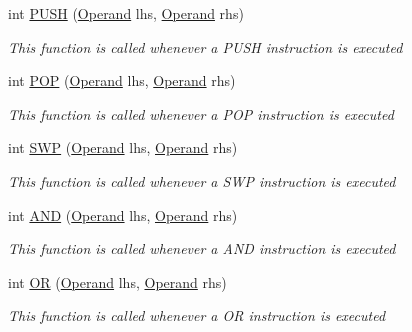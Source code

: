\begin{DoxyCompactItemize}
int \hyperlink{class_c_p_u___o_s___simulator_1_1_c_p_u_1_1_instruction_a4a6711b8309af629c9460cdadc340444}{P\+U\+S\+H} (\hyperlink{class_c_p_u___o_s___simulator_1_1_c_p_u_1_1_operand}{Operand} lhs, \hyperlink{class_c_p_u___o_s___simulator_1_1_c_p_u_1_1_operand}{Operand} rhs)
\begin{DoxyCompactList}\small\item\em This function is called whenever a P\+U\+S\+H instruction is executed \end{DoxyCompactList}\item 
int \hyperlink{class_c_p_u___o_s___simulator_1_1_c_p_u_1_1_instruction_a16a47493684bb30a289d337188fb77b6}{P\+O\+P} (\hyperlink{class_c_p_u___o_s___simulator_1_1_c_p_u_1_1_operand}{Operand} lhs, \hyperlink{class_c_p_u___o_s___simulator_1_1_c_p_u_1_1_operand}{Operand} rhs)
\begin{DoxyCompactList}\small\item\em This function is called whenever a P\+O\+P instruction is executed \end{DoxyCompactList}\item 
int \hyperlink{class_c_p_u___o_s___simulator_1_1_c_p_u_1_1_instruction_ac86363232497de67ac268dd8942294a3}{S\+W\+P} (\hyperlink{class_c_p_u___o_s___simulator_1_1_c_p_u_1_1_operand}{Operand} lhs, \hyperlink{class_c_p_u___o_s___simulator_1_1_c_p_u_1_1_operand}{Operand} rhs)
\begin{DoxyCompactList}\small\item\em This function is called whenever a S\+W\+P instruction is executed \end{DoxyCompactList}\item 
int \hyperlink{class_c_p_u___o_s___simulator_1_1_c_p_u_1_1_instruction_a4b5e469acee3a32016220af620b98650}{A\+N\+D} (\hyperlink{class_c_p_u___o_s___simulator_1_1_c_p_u_1_1_operand}{Operand} lhs, \hyperlink{class_c_p_u___o_s___simulator_1_1_c_p_u_1_1_operand}{Operand} rhs)
\begin{DoxyCompactList}\small\item\em This function is called whenever a A\+N\+D instruction is executed \end{DoxyCompactList}\item 
int \hyperlink{class_c_p_u___o_s___simulator_1_1_c_p_u_1_1_instruction_a32adcd85bab5adfeeb4effa90275dee5}{O\+R} (\hyperlink{class_c_p_u___o_s___simulator_1_1_c_p_u_1_1_operand}{Operand} lhs, \hyperlink{class_c_p_u___o_s___simulator_1_1_c_p_u_1_1_operand}{Operand} rhs)
\begin{DoxyCompactList}\small\item\em This function is called whenever a O\+R instruction is executed \end{DoxyCompactList}\item 

\end{DoxyCompactItemize}
